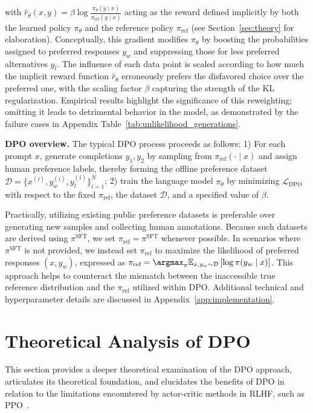 with $\hat{r}_\theta(x, y) = \beta \log \frac{\pi_\theta(y \mid x)}{\pi_\text{ref}(y \mid x)}$ acting as the reward defined implicitly by both the learned policy $\pi_\theta$ and the reference policy $\pi_\text{ref}$ (see Section~\ref{sec:theory} for elaboration). Conceptually, this gradient modifies $\pi_\theta$ by boosting the probabilities assigned to preferred responses $y_w$ and suppressing those for less preferred alternatives $y_l$. The influence of each data point is scaled according to how much the implicit reward function $\hat{r}_\theta$ erroneously prefers the disfavored choice over the preferred one, with the scaling factor $\beta$ capturing the strength of the KL regularization. Empirical results highlight the significance of this reweighting; omitting it leads to detrimental behavior in the model, as demonstrated by the failure cases in Appendix Table~\ref{tab:unlikelihood_generations}.

\textbf{DPO overview.} The typical DPO process proceeds as follows: 1) For each prompt $x$, generate completions $y_1, y_2$ by sampling from $\pi_\text{ref}(\cdot \mid x)$ and assign human preference labels, thereby forming the offline preference dataset $\mathcal{D} = \{x^{(i)}, y_w^{(i)}, y_l^{(i)}\}_{i=1}^N$; 2) train the language model $\pi_\theta$ by minimizing $\mathcal{L}_\text{DPO}$ with respect to the fixed $\pi_\text{ref}$, the dataset $\mathcal{D}$, and a specified value of $\beta$.

Practically, utilizing existing public preference datasets is preferable over generating new samples and collecting human annotations. Because such datasets are derived using $\pi^\text{SFT}$, we set $\pi_\text{ref} = \pi^\text{SFT}$ whenever possible. In scenarios where $\pi^\text{SFT}$ is not provided, we instead set $\pi_\text{ref}$ to maximize the likelihood of preferred responses ${(x, y_w)}$, expressed as ${\pi_\text{ref} = \argmax_{\pi}\mathbb{E}_{x, y_w \sim \mathcal{D}}\left[\log \pi(y_w \mid x)\right]}$. This approach helps to counteract the mismatch between the inaccessible true reference distribution and the $\pi_\text{ref}$ utilized within DPO. Additional technical and hyperparameter details are discussed in Appendix~\ref{app:implementation}.

\section{Theoretical Analysis of DPO}
This section provides a deeper theoretical examination of the DPO approach, articulates its theoretical foundation, and elucidates the benefits of DPO in relation to the limitations encountered by actor-critic methods in RLHF, such as PPO~\cite{schulman2017proximal}.

